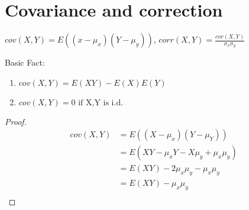 \documentclass{article}
\begin{document}
\section*{Covariance and correction}
\begin{definition}
    $cov (X,Y)=E((x-\mu_{x})(Y-\mu_{y}))$, $corr (X,Y)=\frac{cov (X,Y)}{\sigma_{x}\sigma_{y}} $
\end{definition}

Basic Fact:
\begin{enumerate}
    \item $cov (X,Y)=E(XY)-E(X)E(Y) $
    \item $cov (X,Y)=0 \text{ if X,Y is i.d.}$
    
\end{enumerate}
\begin{proof}
    \begin{align*}
        cov (X,Y)&= E((X-\mu_{x}) (Y-\mu_{Y})) \\
        &= E(XY-\mu_{x}Y-X\mu_{y}+\mu_{x}\mu_{y}) \\
        &= E( XY )-2 \mu_{x}\mu_{y}-\mu_{x}\mu_{y}\\
        &= E( XY )  -\mu_{x}\mu_{y} \\
    \end{align*}
\end{proof}
\end{document}

